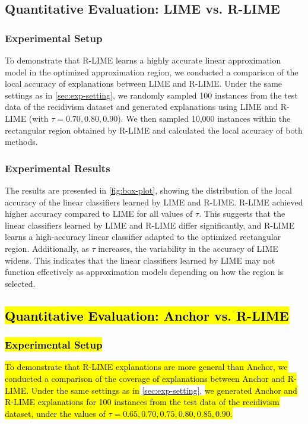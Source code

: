 \documentclass[runningheads]{llncs}
\begin{document}
{\vspace{-1pt}
\subsection{Quantitative Evaluation: LIME vs. R-LIME}

\subsubsection{Experimental Setup}
To demonstrate that R-LIME learns a highly accurate linear approximation model
in the optimized approximation region,
we conducted a comparison of the local accuracy of explanations
between LIME and R-LIME\@.
Under the same settings as in \cref{sec:exp-setting},
we randomly sampled 100 instances from the test data of the recidivism dataset
and generated explanations using LIME and R-LIME (with $\tau=0.70,0.80,0.90$).
We then sampled 10,000 instances within the rectangular region
obtained by R-LIME and calculated the local accuracy of both methods.

\subsubsection{Experimental Results}
The results are presented in \cref{fig:box-plot},
showing the distribution of the local accuracy of the linear classifiers
learned by LIME and R-LIME\@.
R-LIME achieved higher accuracy compared to LIME for all values of $\tau$.
This suggests that the linear classifiers learned by LIME and R-LIME
differ significantly,
and R-LIME learns a high-accuracy linear classifier
adapted to the optimized rectangular region.
Additionally, as $\tau$ increases,
the variability in the accuracy of LIME widens.
This indicates that the linear classifiers learned by LIME may not function
effectively as approximation models depending on how the region is selected.

\subsection{\hl{Quantitative Evaluation: Anchor vs. R-LIME}}\label{sec:exp-anchor}
\subsubsection{\hl{Experimental Setup}}
\hl{%
  To demonstrate that R-LIME explanations are more general than Anchor,
  we conducted a comparison of the coverage of explanations
  between Anchor and R-LIME\@.
  Under the same settings as in
}\cref{sec:exp-setting},
\hl{%
  we generated Anchor and R-LIME explanations
  for 100 instances from the test data of the recidivism dataset,
  under the values of $\tau=0.65,0.70,0.75,0.80,0.85,0.90$.
}

}
\end{document}
